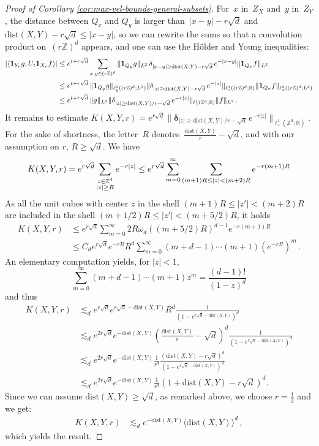 \documentclass[12pt]{article}
\newcommand{\dXY}{{\mathrm{dist}(X,Y)}}
\theoremstyle{plain}
\begin{document}
\begin{proof}[Proof of Corollary \ref{cor:max-vel-bounds-general-subsets}]
For~$x$ in~$Z_X$ and~$y$ in~$Z_Y$, the distance between $Q_x$ and $Q_y$ is larger than~$|x-y|-r\sqrt{d}$ and $\dXY-r\sqrt{d}\leq |x-y|$, so we can rewrite the sums so that a convolution product on~$(r\mathbb{Z})^d$ appears, and one can use the Hölder and Young inequalities:
\begin{align*}
|\langle\mathbf{1}_{Y_r}g, U_{t} \mathbf{1}_{X_r}f \rangle |
& \leq e^{t+r\sqrt{d}}\sum_{x,y\in(r\mathbb{Z})^{d}}\|\mathbf{1}_{Q_{y}}g\|_{L^{2}}\,\mathbf{\delta}_{|x-y|\geq \dXY-r\sqrt{d}}\,e^{-|x-y|}\|\mathbf{1}_{Q_{x}}f\|_{L^{2}}\\ \allowdisplaybreaks
 & \leq e^{t+r\sqrt{d}}\,\|\mathbf{1}_{Q_{y}}g\|_{\ell_{y}^{2}((r\mathbb{Z})^{d};L^{2})}\|\mathbf{\delta}_{|z|\geq \dXY-r\sqrt{d}}\,e^{-|z|}\|_{\ell_{z}^{1}((r\mathbb{Z})^{d};\mathbb{R})}\|\mathbf{1}_{Q_{x}}f\|_{\ell_{x}^{2}((r\mathbb{Z})^{d};L^{2})}\\
 & \leq e^{t+r\sqrt{d}}\,\|g\|_{L^{2}}\|\mathbf{\delta}_{|z|\geq \dXY/r-\sqrt{d}}\,e^{-r|z|}\|_{\ell_{z}^{1}(\mathbb{Z}^{d};\mathbb{R})}\|f\|_{L^{2}}\,.
\end{align*}
It remains to estimate $K(X,Y,r)=e^{r\sqrt{d}}\|\mathbf{\delta}_{|z|\geq \dXY/r-\sqrt{d}}\,e^{-r|z|}\|_{\ell_{z}^{1}(\mathbb{Z}^{d};\mathbb{R})}$. For the sake of shortness, the letter~$R$ denotes~$\frac{\dXY}{r}-\sqrt{d}$, and with our assumption on $r$, $R\geq\sqrt{d}$. We have
\[
K(X,Y,r)  = e^{r\sqrt{d}}\sum_{\substack{z\in\mathbb{Z}^{d}\\
|z|\geq R
}
}e^{-r|z|} 
  \leq e^{r\sqrt{d}} \sum_{m=0}^{\infty}\sum_{(m+1)R\leq |z|<(m+2)R}e^{-r(m+1)R}\\
\]
As all the unit cubes with center $z$ in the shell $(m+1)R\leq |z'| < (m+2)R$ are included in the shell $(m+1/2)R\leq |z'|< (m+5/2)R$, it holds
\begin{align*}
K(X,Y,r) 
 & \leq e^{r\sqrt{d}}\sum_{m=0}^{\infty}2R\omega_{d}((m+5/2)R)^{d-1}e^{-r(m+1)R}\\
 & \leq C_{d}e^{r\sqrt{d}} e^{-rR}R^{d}\sum_{m=0}^{\infty}(m+d-1)\cdots(m+1)(e^{-rR})^{m}\,.
\end{align*}
An elementary computation yields, for $|z|<1$,
\[\sum_{m=0}^{\infty}(m+d-1)\cdots(m+1)z^{m}= \frac{(d-1)!}{(1-z)^{d}}\]
and thus
\begin{align*}
K(X,Y,r)
 & \lesssim_{d}e^{r\sqrt{d}}e^{r\sqrt{d}-\dXY}R^{d}\frac{1}{(1-e^{r\sqrt{d}-\dXY})^{d}}\\
 & \lesssim_{d}e^{2r\sqrt{d}}e^{-\dXY}(\frac{\dXY}{r}-\sqrt{d})^{d}\frac{1}{(1-e^{r\sqrt{d}-\dXY})^{d}}\\
 & \lesssim_{d}e^{2r\sqrt{d}}e^{-\dXY}\frac{1}{r^{d}}\frac{(\dXY-r\sqrt{d})^{d}}{(1-e^{r\sqrt{d}-\dXY})^{d}}\\
 & \lesssim_{d}e^{2r\sqrt{d}}e^{-\dXY}\frac{1}{r^{d}}(1+\dXY-r\sqrt{d})^{d}.
\end{align*}
Since we can assume $\dXY\geq \sqrt{d}$, as remarked above, we choose $r=\frac{1}{2}$ and we get:
\begin{align*}
K(X,Y,r)
 & \lesssim_{d}e^{-\dXY} \langle\dXY\rangle^{d}\,,
\end{align*}
which yields the result.
\end{proof}
\end{document}
